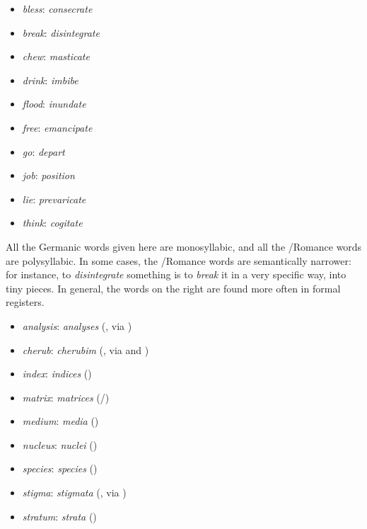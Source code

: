 \begin{multicols}{2}
\begin{itemize}
    \item \textit{bless}: \textit{consecrate}
    \item \textit{break}: \textit{disintegrate}
    \item \textit{chew}: \textit{masticate}
    \item \textit{drink}: \textit{imbibe}
    \item \textit{flood}: \textit{inundate}
    \item \textit{free}: \textit{emancipate}
    \item \textit{go}: \textit{depart}
    \item \textit{job}: \textit{position}
    \item \textit{lie}: \textit{prevaricate}
    \item \textit{think}: \textit{cogitate}
\end{itemize}
\end{multicols}

\noindent All the Germanic words given here are monosyllabic, and all the /Romance words are polysyllabic. In some cases, the /Romance words are semantically narrower: for instance, to \emph{disintegrate} something is to \emph{break} it in a very specific way, into tiny pieces. In general, the words on the right are found more often in formal registers.\\

\noindent\textbf{}

\begin{itemize}
    \item \textit{analysis}: \emph{analyses} (, via )
    \item \textit{cherub}: \emph{cherubim} (, via  and )
    \item \textit{index}: \emph{indices} ()
    \item \textit{matrix}: \emph{matrices} (/)
    \item \textit{medium}: \emph{media} ()
    \item \textit{nucleus}: \emph{nuclei} ()
    \item \textit{species}: \emph{species} ()
    \item \textit{stigma}: \emph{stigmata} (, via )
    \item \textit{stratum}: \emph{strata} ()
\end{itemize}

